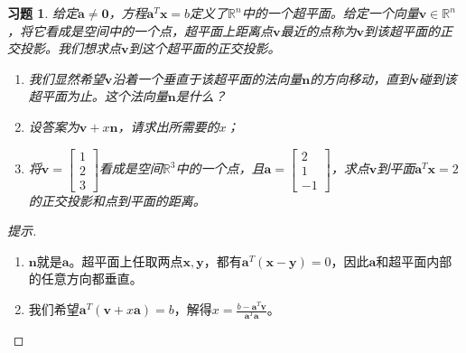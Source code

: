 \documentclass[UTF8]{ctexart}
\newtheorem{ex}[thm]{习题}
\begin{document}
\begin{ex}
给定$\bm a\neq \bm 0$，方程$\bm a^{T}\bm x=b$定义了$\mathbb{R}^n$中的一个超平面。给定一个向量$\bm v\in\mathbb{R}^n$，将它看成是空间中的一个点，超平面上距离点$\bm v$最近的点称为$\bm v$到该超平面的正交投影。我们想求点$\bm v$到这个超平面的正交投影。
\begin{enumerate}
\item 我们显然希望$\bm v$沿着一个垂直于该超平面的法向量$\bm n$的方向移动，直到$\bm v$碰到该超平面为止。这个法向量$\bm n$是什么？
\item 设答案为$\bm v+x\bm n$，请求出所需要的$x$；
\item 将$\bm v=\begin{bmatrix}1\\2\\3\end{bmatrix}$看成是空间$\mathbb{R}^3$中的一个点，且$\bm a=\begin{bmatrix}2\\1\\-1\end{bmatrix}$，求点$\bm v$到平面$\bm a^{T}\bm x=2$的正交投影和点到平面的距离。
\end{enumerate}
\end{ex}


\begin{proof}[提示]
\begin{enumerate}
\item $\bm n$就是$\bm a$。超平面上任取两点$\bm x,\bm y$，都有$\bm a^T(\bm x-\bm y)=0$，因此$\bm a$和超平面内部的任意方向都垂直。
\item 我们希望$\bm a^T(\bm v+x\bm a)=b$，解得$x=\frac{b-\bm a^T\bm v}{\bm a^T\bm a}$。

\end{enumerate}
\end{proof}
\end{document}

